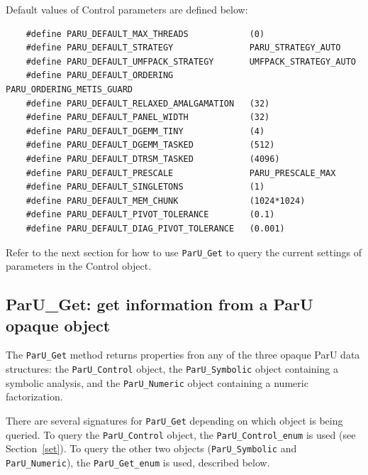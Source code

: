 \documentclass[12pt]{article}
\begin{document}
Default values of Control parameters are defined below:

    {\footnotesize
    \begin{verbatim}
    #define PARU_DEFAULT_MAX_THREADS            (0)
    #define PARU_DEFAULT_STRATEGY               PARU_STRATEGY_AUTO
    #define PARU_DEFAULT_UMFPACK_STRATEGY       UMFPACK_STRATEGY_AUTO
    #define PARU_DEFAULT_ORDERING               PARU_ORDERING_METIS_GUARD
    #define PARU_DEFAULT_RELAXED_AMALGAMATION   (32)
    #define PARU_DEFAULT_PANEL_WIDTH            (32)
    #define PARU_DEFAULT_DGEMM_TINY             (4)
    #define PARU_DEFAULT_DGEMM_TASKED           (512)
    #define PARU_DEFAULT_DTRSM_TASKED           (4096)
    #define PARU_DEFAULT_PRESCALE               PARU_PRESCALE_MAX
    #define PARU_DEFAULT_SINGLETONS             (1)
    #define PARU_DEFAULT_MEM_CHUNK              (1024*1024)
    #define PARU_DEFAULT_PIVOT_TOLERANCE        (0.1)
    #define PARU_DEFAULT_DIAG_PIVOT_TOLERANCE   (0.001) \end{verbatim}}

Refer to the next section for how to use \verb'ParU_Get' to query
the current settings of parameters in the Control object.

\subsection{{\sf ParU\_Get}: get information from a ParU opaque object}
\label{get}

The \verb'ParU_Get' method returns properties fron any of the three opaque ParU
data structures: the \verb'ParU_Control' object, the \verb'ParU_Symbolic'
object containing a symbolic analysis, and the \verb'ParU_Numeric' object
containing a numeric factorization.

There are several signatures for \verb'ParU_Get' depending on which
object is being queried.  To query the \verb'ParU_Control' object,
the \verb'ParU_Control_enum' is used (see Section~\ref{set}).  To query the
other two objects (\verb'ParU_Symbolic' and  \verb'ParU_Numeric'), the
\verb'ParU_Get_enum' is used, described below.
\end{document}
